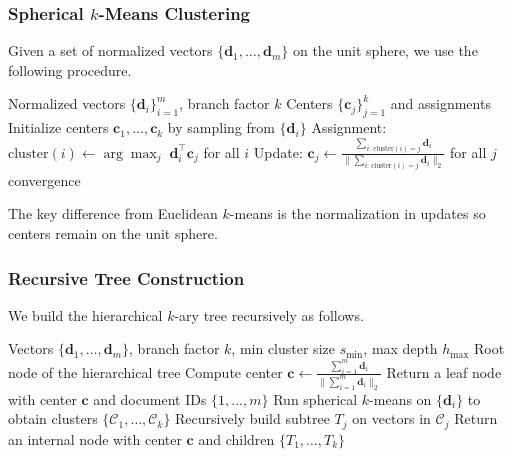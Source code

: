 \documentclass[journal]{IEEEtran}
\begin{document}
\subsubsection{Spherical $k$-Means Clustering}

Given a set of normalized vectors $\{\mathbf{d}_1, \ldots, \mathbf{d}_m\}$ on the unit sphere, we use the following procedure.

\begin{algorithm}[t]
\caption{Spherical $k$-Means}
\label{alg:spherical_kmeans}
\begin{algorithmic}[1]
\REQUIRE Normalized vectors $\{\mathbf{d}_i\}_{i=1}^m$, branch factor $k$
\ENSURE Centers $\{\mathbf{c}_j\}_{j=1}^k$ and assignments
\STATE Initialize centers $\mathbf{c}_1,\ldots,\mathbf{c}_k$ by sampling from $\{\mathbf{d}_i\}$
\REPEAT
  \STATE Assignment: $\text{cluster}(i) \leftarrow \arg\max_j\; \mathbf{d}_i^{\top} \mathbf{c}_j$ for all $i$
  \STATE Update: $\mathbf{c}_j \leftarrow \frac{\sum_{i:\,\text{cluster}(i)=j} \mathbf{d}_i}{\big\|\sum_{i:\,\text{cluster}(i)=j} \mathbf{d}_i\big\|_2}$ for all $j$
\UNTIL convergence
\end{algorithmic}
\end{algorithm}

The key difference from Euclidean $k$-means is the normalization in updates so centers remain on the unit sphere.

\subsubsection{Recursive Tree Construction}

We build the hierarchical $k$-ary tree recursively as follows.

\begin{algorithm}[t]
\caption{Build Hierarchical Spherical Tree}
\label{alg:build_tree}
\begin{algorithmic}[1]
\REQUIRE Vectors $\{\mathbf{d}_1, \ldots, \mathbf{d}_m\}$, branch factor $k$, min cluster size $s_{\min}$, max depth $h_{\max}$
\ENSURE Root node of the hierarchical tree
\STATE Compute center $\mathbf{c} \leftarrow \frac{\sum_{i=1}^m \mathbf{d}_i}{\big\|\sum_{i=1}^{m} \mathbf{d}_i\big\|_2}$
  \STATE Return a leaf node with center $\mathbf{c}$ and document IDs $\{1,\ldots,m\}$
\ELSE
  \STATE Run spherical $k$-means on $\{\mathbf{d}_i\}$ to obtain clusters $\{\mathcal{C}_1,\ldots,\mathcal{C}_k\}$
    \STATE Recursively build subtree $T_j$ on vectors in $\mathcal{C}_j$
  \ENDFOR
  \STATE Return an internal node with center $\mathbf{c}$ and children $\{T_1,\ldots,T_k\}$
\ENDIF
\end{algorithmic}
\end{algorithm}
\end{document}
